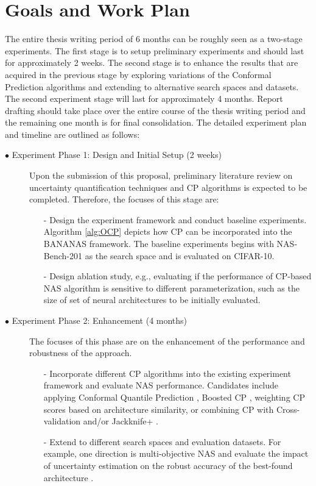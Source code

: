 \documentclass[a4paper]{scrartcl}
\begin{document}
\section{Goals and Work Plan}
The entire thesis writing period of 6 months can be roughly seen as a two-stage experiments. 
The first stage is to setup preliminary experiments and should last for approximately 2 weeks. The second stage is to enhance the results that are acquired in the previous stage by exploring variations of the Conformal Prediction algorithms and extending to alternative search spaces and datasets. The second experiment stage will last for approximately 4 months. Report drafting should take place over the entire course of the thesis writing period and the remaining one month is for final consolidation. The detailed experiment plan and timeline are outlined as follows:

\begin{description}
  \item[$\bullet$ Experiment Phase 1: Design and Initial Setup (2 weeks)] Upon the submission of this proposal, preliminary literature review on uncertainty quantification techniques and CP algorithms is expected to be completed. Therefore, the focuses of this stage are:
  
		\begin{itemize} 
		\item[-] Design the experiment framework and conduct baseline experiments. Algorithm \ref{alg:OCP} depicts how CP can be incorporated into the BANANAS framework. The baseline experiments begins with NAS-Bench-201 as the search space and is evaluated on CIFAR-10.
		\item[-] Design ablation study, e.g., evaluating if the performance of CP-based NAS algorithm is sensitive to different parameterization, such as the size of set of neural architectures to be initially evaluated.	
        \end{itemize}

  
  \item[$\bullet$ Experiment Phase 2: Enhancement (4 months)] The focuses of this phase are on the enhancement of the performance and robustness of the approach.
   		
  		\begin{itemize} 
		\item[-] Incorporate different CP algorithms into the existing experiment framework and evaluate NAS performance. Candidates include applying Conformal Quantile Prediction \cite{Romano2019ConformalizedQR}, Boosted CP \cite{Xie2024BoostedCP},  weighting CP scores based on architecture similarity, or combining CP with Cross-validation and/or Jackknife+ \cite{romano2020classification}.
		\item[-] Extend to different search spaces and evaluation datasets. For example, one direction is multi-objective NAS and evaluate the impact of uncertainty estimation on the robust accuracy of the best-found architecture \cite{Jung2023}.  		
		\end{itemize}

\end{description}


\newpage


\end{document}
